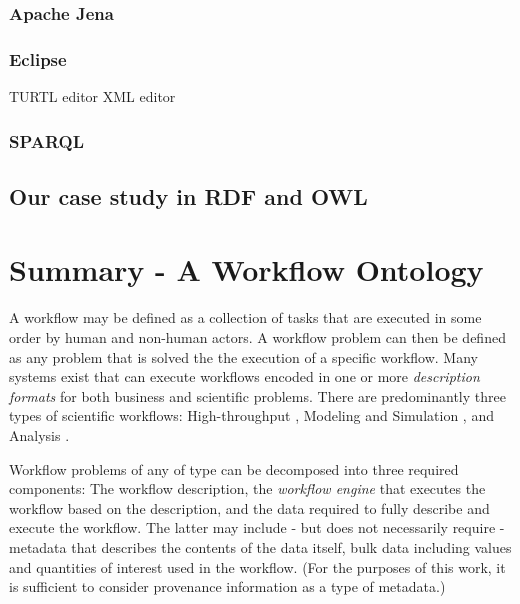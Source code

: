\subsubsection{Apache Jena}
\subsubsection{Eclipse}
TURTL editor
XML editor
\subsubsection{SPARQL}

\subsection{Our case study in RDF and OWL}

\section{Summary - A Workflow Ontology}

A workflow may be defined as a collection of tasks that are executed in some
order by human and non-human actors. A workflow problem can then be defined as
any problem that is solved the the execution of a specific workflow. Many
systems exist that can execute workflows encoded in one or more
\textit{description formats} for both business and scientific problems. There
are predominantly three types of scientific workflows: High-throughput \cite{},
Modeling and Simulation \cite{}, and Analysis \cite{}.

Workflow problems of any of type can be decomposed into three required
components: The workflow description, the \textit{workflow engine} that
executes the workflow based on the description, and the data required to fully
describe and execute the workflow. The latter may include - but does not
necessarily require - metadata that describes the contents of the data itself,
bulk data including values and quantities of interest used in the workflow.
(For the purposes of this work, it is sufficient to consider provenance
information as a type of metadata.)